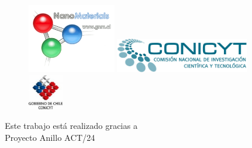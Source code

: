 \documentclass[a4paper,10pt]{scrbook}
\begin{document}
\vfill
\begin{center}
\begin{figure}[!hbt]\centering
\includegraphics[height=3cm]{gnm.pdf}\hskip2cm
\includegraphics[height=1.5cm]{conicyt.jpg}
\includegraphics[height=1.5cm]{gob-chile.jpeg}
\end{figure}
\end{center}
\begin{flushright}
 Este trabajo est\'a realizado gracias a\\
 Proyecto Anillo ACT/24
\end{flushright}



\newpage\pagestyle{empty}\tableofcontents\newpage
\pagestyle{fancy}
\newpage
\end{document}
